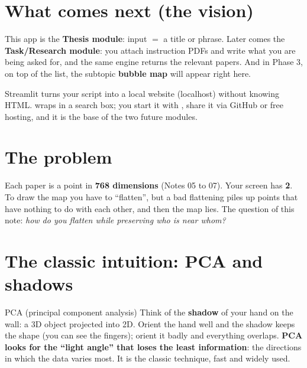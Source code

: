 \documentclass[11pt,a4paper]{article}
\begin{document}
\section{What comes next (the vision)}

This app is the \textbf{Thesis module}: input $=$ a title or phrase. Later comes the
\textbf{Task/Research module}: you attach instruction PDFs and write what you are being asked
for, and the same engine returns the relevant papers. And in Phase 3, on top of the list, the
subtopic \textbf{bubble map} will appear right here.

\begin{resumen}
Streamlit turns your script into a local website (localhost) without knowing HTML.
 wraps  in a search box; you start it with
, share it via GitHub or free hosting, and it is the base of the
two future modules.
\end{resumen}
\clearpage
{}
{}

\section{The problem}

Each paper is a point in \textbf{768 dimensions} (Notes 05 to 07). Your screen has
\textbf{2}. To draw the map you have to ``flatten'', but a bad flattening piles up points that
have nothing to do with each other, and then the map lies. The question of this note:
\emph{how do you flatten while preserving who is near whom?}

\section{The classic intuition: PCA and shadows}

\begin{concepto}{PCA (principal component analysis)}
Think of the \textbf{shadow} of your hand on the wall: a 3D object projected into 2D. Orient
the hand well and the shadow keeps the shape (you can see the fingers); orient it badly and
everything overlaps. \textbf{PCA looks for the ``light angle'' that loses the least
information}: the directions in which the data varies most. It is the classic technique, fast
and widely used.
\end{concepto}
\end{document}
